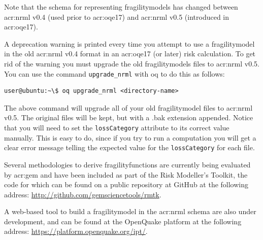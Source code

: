 Note that the schema for representing \glspl{fragilitymodel} has changed
between \gls{acr:nrml} v0.4 (used prior to \gls{acr:oqe17}) and \gls{acr:nrml}
v0.5 (introduced in \gls{acr:oqe17}).

A deprecation warning is printed every time you attempt to use a
\gls{fragilitymodel} in the old \gls{acr:nrml} v0.4 format in an
\gls{acr:oqe17} (or later) risk calculation. To get rid of the warning you
must upgrade the old \glspl{fragilitymodel} files to \gls{acr:nrml} v0.5. You
can use the command \Verb+upgrade_nrml+ with oq to do this as follows:

\begin{verbatim}
user@ubuntu:~\$ oq upgrade_nrml <directory-name>
\end{verbatim}

The above command will upgrade all of your old \gls{fragilitymodel} files to
\gls{acr:nrml} v0.5. The original files will be kept, but with a .bak extension
appended. Notice that you will need to set the \Verb+lossCategory+ attribute
to its correct value manually. This is easy to do, since if you try to run a
computation you will get a clear error message telling the expected value for
the \Verb+lossCategory+ for each file.


Several methodologies to derive \glspl{fragilityfunction} are currently being
evaluated by \gls{acr:gem} and have been included as part of the Risk
Modeller's Toolkit, the code for which can be found on a public repository at
GitHub at the following address: 
\href{http://github.com/gemsciencetools/rmtk}{http://github.com/gemsciencetools/rmtk}.

A web-based tool to build a \gls{fragilitymodel} in the \gls{acr:nrml} schema
are also under development, and can be found at the OpenQuake platform at the
following address: \href{https://platform.openquake.org/ipt/}{https://platform.openquake.org/ipt/}.